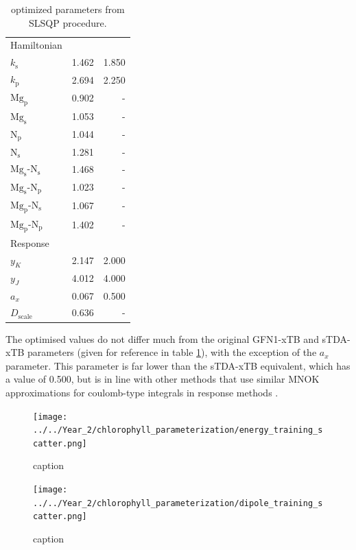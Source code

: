 \begin{table}
    \centering
    \begin{tabular}{|| l r | r ||}
    \hline
    Hamiltonian & & \\
    $k_\text{s}$ & 1.462 & 1.850 \\
    $k_\text{p}$ & 2.694 & 2.250 \\

    $\text{Mg}_\text{p}$ & 0.902 & - \\
    $\text{Mg}_\text{s}$ & 1.053 & - \\
    $\text{N}_\text{p}$ & 1.044 & - \\
    $\text{N}_\text{s}$ & 1.281 & - \\

    $\text{Mg}_\text{s}$-$\text{N}_\text{s}$ & 1.468 & - \\
    $\text{Mg}_\text{s}$-$\text{N}_\text{p}$ & 1.023 & - \\
    $\text{Mg}_\text{p}$-$\text{N}_\text{s}$ & 1.067 & - \\
    $\text{Mg}_\text{p}$-$\text{N}_\text{p}$ & 1.402 & - \\

    \hline\hline
    Response & & \\
    $y_K$ & 2.147 & 2.000 \\
    $y_J$ & 4.012 & 4.000 \\
    $a_x$ & 0.067 & 0.500 \\
    $D_{\text{scale}}$ & 0.636 & - \\
    \hline
    \end{tabular}
    \caption{optimized parameters from SLSQP procedure.}
    \label{table:chl_params}
\end{table}

The optimised values do not differ much from the original GFN1-xTB and sTDA-xTB
parameters (given for reference in table \ref{table:chl_params}), with the exception
of the $a_x$ parameter. This parameter is far lower than the sTDA-xTB equivalent,
which has a value of 0.500, but is in line with other methods that use similar MNOK
approximations for coulomb-type integrals in response methods \cite{Cho2021}.

\begin{figure}
    \centering
    \texttt{[image: ../../Year\_2/chlorophyll\_parameterization/energy\_training\_scatter.png]}
    \label{fig:energy_training_scatter}
    \caption{caption}
\end{figure}

\begin{figure}
    \centering
    \texttt{[image: ../../Year\_2/chlorophyll\_parameterization/dipole\_training\_scatter.png]}
    \label{fig:dipole_training_scatter}
    \caption{caption}
\end{figure}

